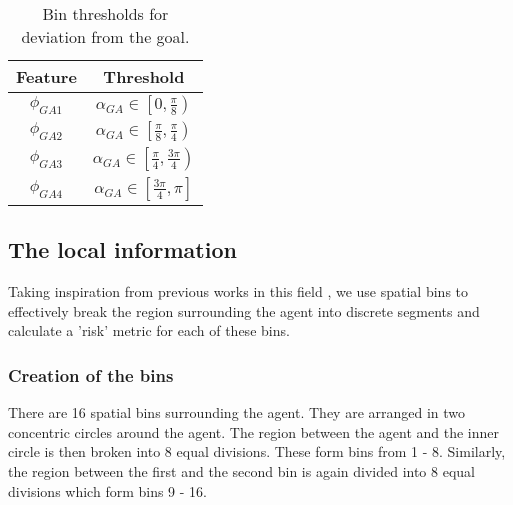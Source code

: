 \begin{table}[htbp]
	\caption{Bin thresholds for deviation from the goal.}
	\label{deviation-from-goal-bins}
	\begin{center}
		\renewcommand{\arraystretch}{1.3}
		\begin{tabular}{|c|c|}
			\hline
			Feature & Threshold \\
			\hline
			$\phi_{GA1}$ & $\alpha_{GA} \in \left[ 0 , \frac{\pi}{8} \right)$ \\
			
			$\phi_{GA2}$ & $\alpha_{GA} \in \left[ \frac{\pi}{8} , \frac{\pi}{4} \right)$ \\
			
			$\phi_{GA3}$ & $\alpha_{GA} \in \left[ \frac{\pi}{4} , \frac{3\pi}{4} \right)$ \\
			
			$\phi_{GA4}$ & $\alpha_{GA} \in \left[ \frac{3\pi}{4} , \pi \right]$ \\
			\hline
		\end{tabular}
	\end{center}
\end{table}

\vspace{3cm}
\subsection*{The local information}
Taking inspiration from previous works in this field \cite{fahad-et-al} \cite{vasquez-et-al}, we use spatial bins to effectively break the region surrounding the agent into discrete segments and calculate a 'risk' metric for each of these bins.

\subsubsection*{Creation of the bins}
There are 16 spatial bins surrounding the agent. They are arranged in two concentric circles around the agent. The region between the agent and the inner circle is then broken into 8 equal divisions. These form bins from 1 - 8. Similarly, the region between the first and the second bin is again divided into 8 equal divisions which form bins 9 - 16.
